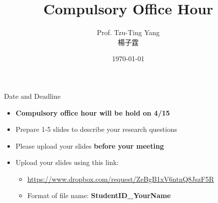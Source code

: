 \documentclass[dvipsnames,hyperref={pdfpagelabels=false}]{beamer}
\title[]  
{Compulsory Office Hour}
\author 
{Prof. Tzu-Ting Yang  \\ 楊子霆}
\institute{Institute of Economics, Academia Sinica  \\ 中央研究院經濟研究所}
\date
{\today}
\begin{document}
\begin{frame}{}
 \titlepage
\end{frame}



\begin{frame}{Date and Deadline}
\begin{itemize} 
\item \textbf{Compulsory office hour will be hold on 4/15} 
\vspace{0.2cm}
\item Prepare 1-5 slides to describe your research questions 
\vspace{0.2cm}
\item Please upload your slides \textbf{before your meeting}
\vspace{0.2cm}
\item Upload your slides using this link:
\vspace{0.2cm}
\begin{itemize} 
\item \url{https://www.dropbox.com/request/ZeBgB1xV6ntnQ8JszF5R}
	\vspace{0.2cm}
\item Format of file name: \textbf{StudentID\_YourName}
\vspace{0.2cm}

\end{itemize}

\end{itemize}
\end{frame}
\end{document}
